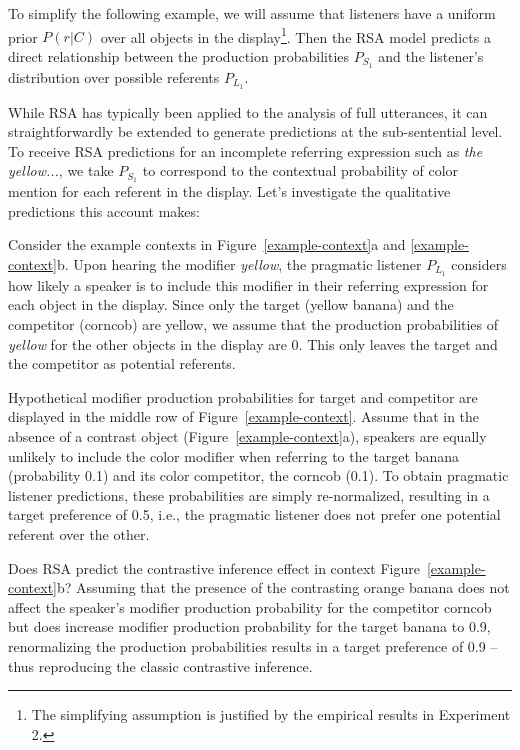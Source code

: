 \documentclass[10pt,letterpaper]{article}
\begin{document}
To simplify the following example, we will assume that listeners have a uniform prior $P(r|C)$ over all objects in the display\footnote{The simplifying assumption is justified by the empirical results in Experiment 2.}. Then the RSA model predicts a direct relationship between the production probabilities $P_{S_1}$ and the listener's distribution over possible referents $P_{L_1}$. 

While RSA has typically been applied to the analysis of full utterances, it can straightforwardly be extended to generate predictions at the sub-sentential level. To receive RSA predictions for an incomplete referring expression such as \textit{the yellow...}, we take $P_{S_1}$ to correspond to the contextual probability of color mention for each referent in the display. Let's investigate the qualitative predictions this account makes:

Consider the example contexts in Figure~\ref{example-context}a and \ref{example-context}b. Upon hearing the modifier \textit{yellow}, the pragmatic listener $P_{L_1}$ considers how likely a speaker is to include this modifier in their referring expression for each object in the display. Since only the target (yellow banana) and the competitor (corncob) are yellow, we assume that the production probabilities of \textit{yellow} for the other objects in the display are 0. This only leaves the target and the competitor as potential referents. 

Hypothetical modifier production probabilities for target and competitor are displayed in the middle row of Figure~\ref{example-context}. 
Assume that in the absence of a contrast object (Figure~\ref{example-context}a), speakers are equally unlikely to include the color modifier when referring to the target banana (probability 0.1) and its color competitor, the corncob (0.1). To obtain pragmatic listener predictions, these probabilities are simply re-normalized, resulting in a target preference of 0.5, i.e., the pragmatic listener does not  prefer one potential referent over the other.

Does RSA predict the contrastive inference effect in context Figure~\ref{example-context}b? Assuming that the presence of the contrasting orange banana does not affect the speaker's modifier production probability for the competitor corncob but does increase modifier production probability for the target banana to 0.9,  renormalizing the production probabilities results in a target preference of 0.9 -- thus reproducing the classic contrastive inference.
\end{document}
